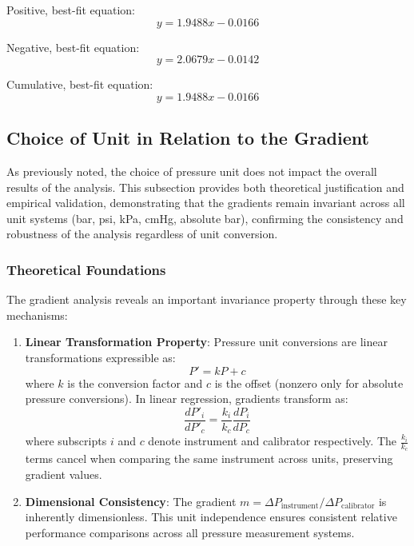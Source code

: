 \documentclass{article}
\begin{document}
\begin{center}
	\hspace*{-2em}
	\begin{minipage}{1.1\textwidth}
		\begin{minipage}{0.3\textwidth}	\centering
			Positive, best-fit equation: 
			\[y = 1.9488x-0.0166\]
		\end{minipage}\hfill
		\begin{minipage}{0.3\textwidth}	\centering
			Negative, best-fit equation: 
			\[y = 2.0679x-0.0142\]
		\end{minipage}\hfill
		\begin{minipage}{0.3\textwidth}	\centering
			Cumulative, best-fit equation: 
			\[y = 1.9488x-0.0166\]
		\end{minipage}
	\end{minipage}
\end{center}
	
\subsection{Choice of Unit in Relation to the Gradient}\label{consistency}
As previously noted, the choice of pressure unit does not impact the overall results of the analysis. This subsection provides both theoretical justification and empirical validation, demonstrating that the gradients remain invariant across all unit systems (bar, psi, kPa, cmHg, absolute bar), confirming the consistency and robustness of the analysis regardless of unit conversion.
\vspace{-8pt}
\subsubsection{Theoretical Foundations}
The gradient analysis reveals an important invariance property through these key mechanisms:

\begin{enumerate}
	\item \textbf{Linear Transformation Property}: 
	Pressure unit conversions are linear transformations expressible as:
	\begin{equation}
		P' = kP + c
	\end{equation}
	where $k$ is the conversion factor and $c$ is the offset (nonzero only for absolute pressure conversions). In linear regression, gradients transform as:
	\begin{equation}
		\frac{dP'_i}{dP'_c} = \frac{k_i}{k_c} \frac{dP_i}{dP_c}
	\end{equation}
	where subscripts $i$ and $c$ denote instrument and calibrator respectively. The $\frac{k_i}{k_c}$ terms cancel when comparing the same instrument across units, preserving gradient values.
	
	\item \textbf{Dimensional Consistency}: 
	The gradient $m = \Delta P_{\text{instrument}}/\Delta P_{\text{calibrator}}$ is inherently dimensionless. This unit independence ensures consistent relative performance comparisons across all pressure measurement systems.
\end{enumerate}
\end{document}
